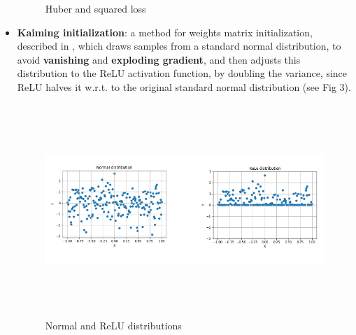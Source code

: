\begin{itemize}
\begin{figure}[H]
\centering
\caption{Huber and squared loss}
\label{fig:s2} 
\end{figure}
\item \textbf{Kaiming initialization}: a method for weights matrix initialization, described in \cite{kaiming}, which draws samples from a standard normal distribution, to avoid \textbf{vanishing} and \textbf{exploding gradient}, and then adjusts this distribution to the ReLU activation function, by doubling the variance, since ReLU halves it w.r.t. to the original standard normal distribution (see Fig 3).
\begin{figure}[H] 
\includegraphics[height=80mm, width=140mm, scale=0.5]{chapters/relu_dist.png}
\centering
\caption{Normal and ReLU distributions}
\label{fig:s3} 
\end{figure}
\end{itemize}

